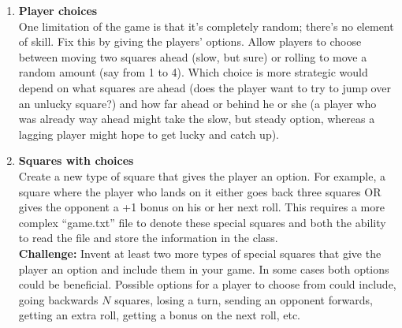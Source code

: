 \begin{enumerate}[{\bf 1.}]
\item {\bf Player choices}\\
One limitation of the game is that it's completely random; there's no element of skill.  Fix this by giving the players' options.  Allow players to choose between moving two squares ahead (slow, but sure) or rolling to move a random amount (say from 1 to 4).  Which choice is more strategic would depend on what squares are ahead (does the player want to try to jump over an unlucky square?) and how far ahead or behind he or she (a player who was already way ahead might take the slow, but steady option, whereas a lagging player might hope to get lucky and catch up).

\item {\bf Squares with choices}\\
Create a new type of square that gives the player an option.  For example, a square where the player who lands on it either goes back three squares OR gives the opponent a +1 bonus on his or her next roll.  This requires a more complex ``game.txt'' file to denote these special squares and both the ability to read the file and store the information in the  class.\\
{\bf Challenge:} Invent at least two more types of special squares that give the player an option and include them in your game. In some cases both options could be beneficial.   Possible options for a player to choose from could include, going backwards $N$ squares, losing a turn, sending an opponent forwards, getting an extra roll, getting a bonus on the next roll, etc.

\end{enumerate}